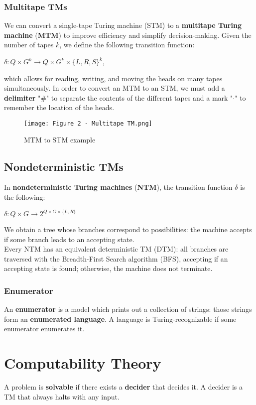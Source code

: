 \documentclass{article}
\begin{document}
\subsubsection{Multitape TMs}
We can convert a single-tape Turing machine (STM) to a \textbf{multitape Turing machine} (\textbf{MTM}) to improve efficiency and simplify decision-making. Given the number of tapes $k$, we define the following transition function:
\begin{center}
    $\delta : Q \times G^k \rightarrow Q \times G^k \times \{L,R,S\}^k$,
\end{center}
which allows for reading, writing, and moving the heads on many tapes simultaneously. In order to convert an MTM to an STM, we must add a \textbf{delimiter} "\#" to separate the contents of the different tapes and a mark "$\cdot$" to remember the location of the heads.
\vspace{0.1cm}
\begin{figure}[H]
    \centering
    \texttt{[image: Figure 2 - Multitape TM.png]}
    \caption{MTM to STM example}
\end{figure}
\newpage
\subsection{Nondeterministic TMs}
In \textbf{nondeterministic Turing machines} (\textbf{NTM}), the transition function $\delta$ is the following:
\begin{center}
    $\delta:Q \times G \rightarrow 2^{Q \times G \times \{L,R\}}$
\end{center}
We obtain a tree whose branches correspond to possibilities: the machine accepts if some branch leads to an accepting state. \\
Every NTM has an equivalent deterministic TM (DTM): all branches are traversed with the Breadth-First Search algorithm (BFS), accepting if an accepting state is found; otherwise, the machine does not terminate.
\subsubsection{Enumerator}
An \textbf{enumerator} is a model which prints out a collection of strings: those strings form an \textbf{enumerated language}. A language is Turing-recognizable if some enumerator enumerates it.

\newpage

\section{Computability Theory}
A problem is \textbf{solvable} if there exists a \textbf{decider} that decides it. A decider is a TM that always halts with any input.
\end{document}
